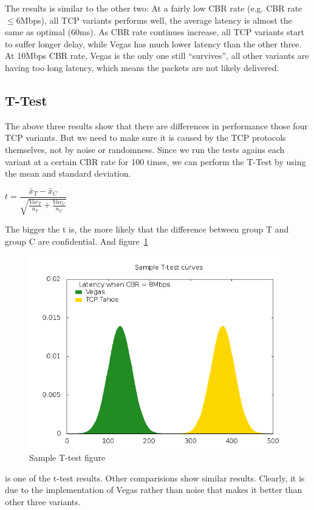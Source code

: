 \documentclass[10pt, conference]{lib/IEEEtran}
\begin{document}
The results is similar to the other two: At a fairly low CBR rate 
(e.g. CBR rate$ \le 6$Mbps), all TCP variants performs well, the 
average latency is almost the same as optimal (60ms). As CBR rate 
continues increase, all TCP variants start to suffer longer delay, 
while Vegas has much lower latency than the other three. At 10Mbps 
CBR rate, Vegas is the only one still ``survives'', all other variants
are having too long latency, which means the packets are not likely 
delivered.

\subsection{T-Test}
The above three results show that there are differences in performance 
those four TCP variants. But we need to make sure it is caused by the
TCP protocols themselves, not by noise or randomness. Since we run the 
tests agains each variant at a certain CBR rate for 100 times, we can
perform the T-Test by using the mean and standard deviation. 
\begin{center}
    $t = \dfrac{\bar{x}_T -\bar{x}_C}{\sqrt{\frac{Var_T}{n_T} + \frac{Var_C}{n_C}}}$
\end{center}
The bigger the t is, the more likely that the difference between group T and group C are confidential. And figure~\ref{fig:exp1_t_test}
\begin{figure}[!htb]
    \centering
    \includegraphics[width=1.0\linewidth]{plot/exp1-t-test.png}
    \caption{Sample T-test figure}
    \label{fig:exp1_t_test}
\end{figure}
is one of the t-test results. Other comparisions show similar results.
Clearly, it is due to the implementation of Vegas rather than noise 
that makes it better than other three variants.
\end{document}
